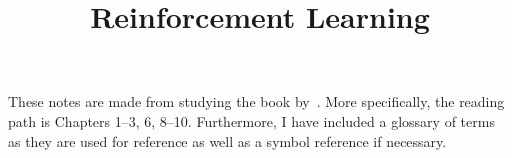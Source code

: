 \documentclass[12pt,notitlepage]{article}
\begin{document}
\title{Reinforcement Learning}
\author{}
\date{}
\maketitle


These notes are made from studying the book by~\cite{sutton2018reinforcement}.
More specifically, the reading path is Chapters 1--3, 6, 8--10. Furthermore, I
have included a glossary of terms as they are used for reference as well as a
symbol reference if necessary.



\end{document}
